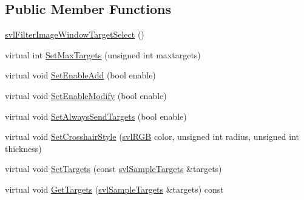 \subsection*{Public Member Functions}
\begin{DoxyCompactItemize}
\item 
\hyperlink{classsvl_filter_image_window_target_select_aa2295fb4d3c9f3697fc9d598497f3a5c}{svl\-Filter\-Image\-Window\-Target\-Select} ()
\item 
virtual int \hyperlink{classsvl_filter_image_window_target_select_a72ac399ec43e425d5f13ea3da2144761}{Set\-Max\-Targets} (unsigned int maxtargets)
\item 
virtual void \hyperlink{classsvl_filter_image_window_target_select_ab102f6d5bbf71df32086f437e9197807}{Set\-Enable\-Add} (bool enable)
\item 
virtual void \hyperlink{classsvl_filter_image_window_target_select_a281125512b6d6f330879e9d42f10b6fe}{Set\-Enable\-Modify} (bool enable)
\item 
virtual void \hyperlink{classsvl_filter_image_window_target_select_aa709dac3ddbb69d3cfbd9bac688020d6}{Set\-Always\-Send\-Targets} (bool enable)
\item 
virtual void \hyperlink{classsvl_filter_image_window_target_select_a0ede076c6b2d721dd0787b77e391865b}{Set\-Crosshair\-Style} (\hyperlink{structsvl_r_g_b}{svl\-R\-G\-B} color, unsigned int radius, unsigned int thickness)
\item 
virtual void \hyperlink{classsvl_filter_image_window_target_select_ac434a5acfc98a39fde05e85daeacef59}{Set\-Targets} (const \hyperlink{classsvl_sample_targets}{svl\-Sample\-Targets} \&targets)
\item 
virtual void \hyperlink{classsvl_filter_image_window_target_select_aa207e577772171edfcda4eddad918c7c}{Get\-Targets} (\hyperlink{classsvl_sample_targets}{svl\-Sample\-Targets} \&targets) const 
\end{DoxyCompactItemize}
